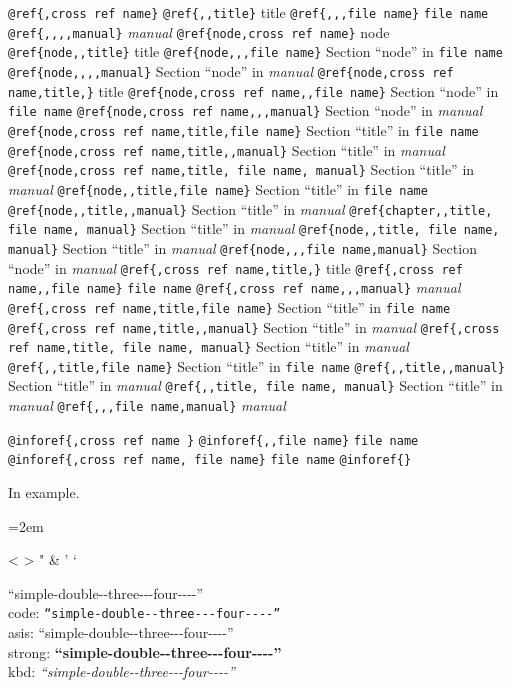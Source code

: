 \documentclass{book}
\begin{document}
\texttt{@ref\{,cross ref name\}} 
\texttt{@ref\{,,title\}} title
\texttt{@ref\{,,,file name\}} \texttt{file name}
\texttt{@ref\{,,,,manual\}} \textit{manual}
\texttt{@ref\{node,cross ref name\}} node
\texttt{@ref\{node,,title\}} title
\texttt{@ref\{node,,,file name\}} Section ``node'' in \texttt{file name}
\texttt{@ref\{node,,,,manual\}} Section ``node'' in \textit{manual}
\texttt{@ref\{node,cross ref name,title,\}} title
\texttt{@ref\{node,cross ref name,,file name\}} Section ``node'' in \texttt{file name}
\texttt{@ref\{node,cross ref name,,,manual\}} Section ``node'' in \textit{manual}
\texttt{@ref\{node,cross ref name,title,file name\}} Section ``title'' in \texttt{file name}
\texttt{@ref\{node,cross ref name,title,,manual\}} Section ``title'' in \textit{manual}
\texttt{@ref\{node,cross ref name,title, file name, manual\}} Section ``title'' in \textit{manual}
\texttt{@ref\{node,,title,file name\}} Section ``title'' in \texttt{file name}
\texttt{@ref\{node,,title,,manual\}} Section ``title'' in \textit{manual}
\texttt{@ref\{chapter,,title, file name, manual\}} Section ``title'' in \textit{manual}
\texttt{@ref\{node,,title, file name, manual\}} Section ``title'' in \textit{manual}
\texttt{@ref\{node,,,file name,manual\}} Section ``node'' in \textit{manual}
\texttt{@ref\{,cross ref name,title,\}} title
\texttt{@ref\{,cross ref name,,file name\}} \texttt{file name}
\texttt{@ref\{,cross ref name,,,manual\}} \textit{manual}
\texttt{@ref\{,cross ref name,title,file name\}} Section ``title'' in \texttt{file name}
\texttt{@ref\{,cross ref name,title,,manual\}} Section ``title'' in \textit{manual}
\texttt{@ref\{,cross ref name,title, file name, manual\}} Section ``title'' in \textit{manual}
\texttt{@ref\{,,title,file name\}} Section ``title'' in \texttt{file name}
\texttt{@ref\{,,title,,manual\}} Section ``title'' in \textit{manual}
\texttt{@ref\{,,title, file name, manual\}} Section ``title'' in \textit{manual}
\texttt{@ref\{,,,file name,manual\}} \textit{manual}

\texttt{@inforef\{,cross ref name \}} 
\texttt{@inforef\{,,file name\}} \texttt{file name}
\texttt{@inforef\{,cross ref name, file name\}} \texttt{file name}
\texttt{@inforef\{\}} 



In example.
\par\begingroup\obeylines\obeyspaces\frenchspacing\leftskip=2em\relax\parskip=0pt\relax\ttfamily{}%

<
>
"
\&
'
`

``simple-double{-}{-}three{-}{-}{-}four{-}{-}{-}-''\leavevmode{}\\
code: \texttt{``simple-double{-}{-}three{-}{-}{-}four{-}{-}{-}-''} \leavevmode{}\\
asis: ``simple-double{-}{-}three{-}{-}{-}four{-}{-}{-}-'' \leavevmode{}\\
strong: \textbf{``simple-double{-}{-}three{-}{-}{-}four{-}{-}{-}-''} \leavevmode{}\\
kbd: {\ttfamily\textsl{``simple-double{-}{-}three{-}{-}{-}four{-}{-}{-}-''}} \leavevmode{}\\
\end{document}
